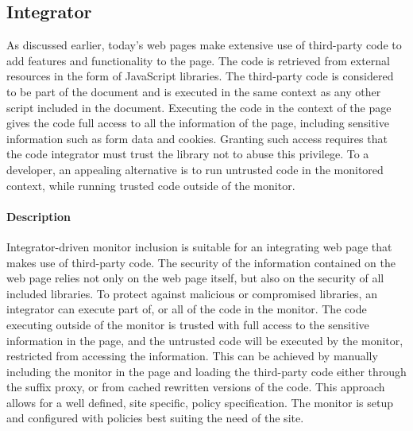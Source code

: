 \documentclass{llncs}
\newcommand{\todo}[1]{\colorbox{red}{\textcolor{white}{\sffamily\bfseries\scriptsize TODO}} \textcolor{red}{#1} \textcolor{red}{$\blacktriangleleft$}}
\begin{document}
\subsection{Integrator}
\label{sec:arch-integrator}

As discussed earlier, today's
 web pages make extensive use of third-party code to add features 
and functionality to the page. The code is retrieved from external resources in 
the form of JavaScript libraries. The third-party code is considered to be part 
of the document and is executed in the same context as any other script 
included in the document. Executing the code in the context of the page gives the code full access to all the information 
of the page, including sensitive information such as form data and cookies. 
Granting such access requires that the code integrator must 
trust the library not to abuse this privilege. To a developer, an appealing alternative 
is to run untrusted code in the monitored context, while running trusted code outside of the 
monitor. 

\paragraph{Description}
Integrator-driven monitor inclusion is suitable for an integrating web page 
that makes use of third-party code.
The security of the information contained on the web 
page relies not only on the web page itself, but also on the security of all 
included libraries. To protect against malicious or compromised libraries, 
an integrator can execute part of, or all of the code in the monitor.
The code executing outside of the monitor is trusted with full access to the 
sensitive information in the page, and the untrusted code will be executed 
by the monitor, restricted from accessing the information.
This can be achieved by manually including the monitor in the page and loading the 
third-party code either through the suffix proxy, or from cached rewritten 
versions of the code. %
This approach allows for a well defined, site specific, policy specification.
The monitor is setup and configured with policies best suiting the need of the 
site. 
\end{document}
